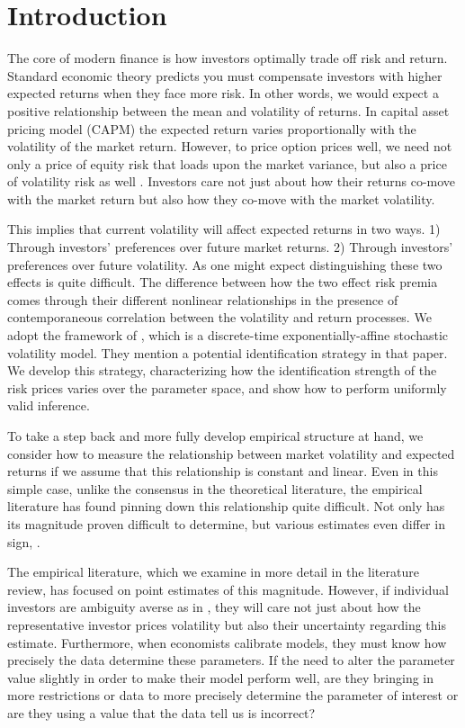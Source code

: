 \documentclass[11pt, letterpaper, twoside]{article}
\begin{document}
\tableofcontents
\clearpage

\section{Introduction}

The core of modern finance is how investors optimally trade off risk and return.  Standard economic theory predicts you must compensate investors with higher expected returns when they face more risk. In other words, we would expect a positive relationship between the mean and volatility of returns. In  capital asset pricing model (CAPM) the expected return varies proportionally with the volatility of the market return. However, to price option prices well, we need not only a price of equity risk that loads upon the market variance, but also a price of volatility risk as well \parencite{christoffersen2013capturing}. Investors care not just about how their returns co-move with the market return but also how they co-move with the market volatility.

This implies that current volatility will affect expected returns in two ways. 1) Through investors' preferences over future market returns. 2) Through investors' preferences over future volatility. As one might expect distinguishing these two effects is quite difficult. The difference between how the two effect risk premia comes through their different nonlinear relationships in the presence of contemporaneous correlation between the volatility and return processes. We adopt the framework of \textcite{han2018leverage}, which is a discrete-time exponentially-affine stochastic volatility model. They mention a potential identification strategy in that paper. We develop this strategy, characterizing how the identification strength of the risk prices varies over the parameter space, and show how to perform uniformly valid inference.

To take a step back and more fully develop empirical structure at hand, we consider how to measure the relationship between market volatility and expected returns if we assume that this relationship is constant and linear. Even in this simple case, unlike the consensus in the theoretical literature, the empirical literature has found pinning down this relationship quite difficult. Not only has its magnitude proven difficult to determine, but various estimates even differ in sign, \parencite{lettau2010measuring}.  

The empirical literature, which we examine in more detail in the literature review, has focused on point estimates of this magnitude. However, if individual investors are ambiguity averse as in \textcite{hansen2001robust, jiu2012ambiguity}, they will care not just about how the representative investor prices volatility but also their uncertainty regarding this estimate. Furthermore, when economists calibrate models, they must know how precisely the data determine these parameters. If the need to alter the parameter value slightly in order to make their model perform well, are they bringing in more restrictions or data to more precisely determine the parameter of interest or are they using a value that the data tell us is incorrect?
\end{document}
